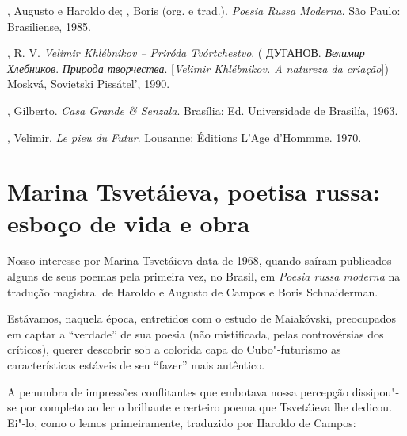 , Augusto e Haroldo de; , Boris (org. e trad.).
\emph{Poesia Russa Moderna}. São Paulo: Brasiliense, 1985.

, R. V. \emph{Velimir Khlébnikov -- Priróda Tvórtchestvo}. (
ДУГАНОВ. \emph{Велимир Хлебников}. \emph{Природа творчества}.
[\emph{Velimir Khlébnikov. A natureza da criação}]) Moskvá,
Sovietski Pissátel', 1990.

, Gilberto. \emph{Casa Grande \& Senzala}. Brasília: Ed.
Universidade de Brasilía, 1963.

, Velimir. \emph{Le pieu du Futur}. Lousanne: Éditions L'Age
d'Hommme. 1970.

\chapter{Marina Tsvetáieva, poetisa russa: esboço de vida e
obra}


Nosso interesse por Marina Tsvetáieva data de 1968, quando saíram
publicados alguns de seus poemas pela primeira vez, no Brasil, em
\emph{Poesia russa moderna} na tradução magistral de Haroldo e Augusto de Campos e
Boris Schnaiderman.

Estávamos, naquela época, entretidos com o estudo de Maiakóvski,
preocupados em captar a ``verdade'' de sua poesia (não mistificada,
pelas controvérsias dos críticos), querer descobrir sob a colorida capa
do Cubo"-futurismo as características estáveis de seu ``fazer'' mais
autêntico.

A penumbra de impressões conflitantes que embotava nossa percepção
dissipou"-se por completo ao ler o brilhante e certeiro poema que
Tsvetáieva lhe dedicou. Ei"-lo, como o lemos primeiramente, traduzido por
Haroldo de Campos:

